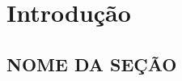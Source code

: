 \documentclass[12pt,a4paper,openany]{abntex2}
\begin{document}
	
\imprimircapa	
\imprimirfolhaderosto

\clearpage
\cleardoublepage
\cleardoublepage

\setcounter{page}{3}

\tableofcontents
\clearpage{\pagestyle{empty}\cleardoublepage}
	
\chapter{Introdução}

\section{NOME DA SEÇÃO}


\end{document}
